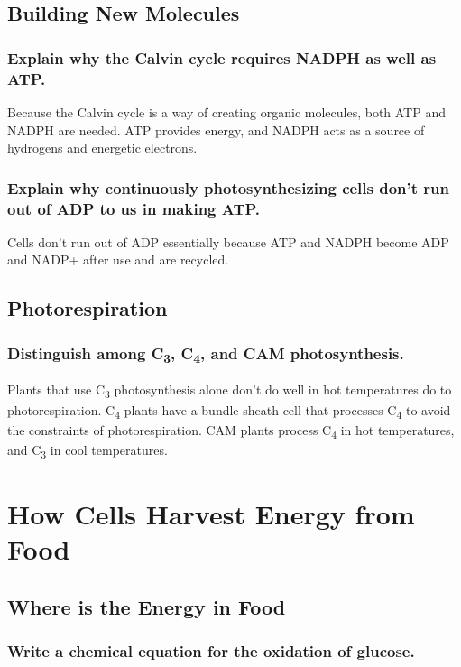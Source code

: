 \documentclass[a4paper]{article}
\begin{document}
\subsection{Building New Molecules}
\subsubsection{Explain why the Calvin cycle requires NADPH as well as ATP.}
Because the Calvin cycle is a way of creating organic molecules, both ATP and NADPH are needed.
ATP provides energy, and NADPH acts as a source of hydrogens and energetic electrons.

\subsubsection{Explain why continuously photosynthesizing cells don't run out of ADP
to us in making ATP.}
Cells don't run out of ADP essentially because ATP and NADPH become ADP and NADP+ 
after use and are recycled.
 

\subsection{Photorespiration}
\subsubsection{Distinguish among C\textsubscript{3}, C\textsubscript{4}, and CAM photosynthesis.}
Plants that use C\textsubscript{3} photosynthesis alone don't do well in hot temperatures
do to photorespiration. C\textsubscript{4} plants have a bundle sheath cell that processes
C\textsubscript{4} to avoid the constraints of photorespiration. CAM plants process C\textsubscript{4}
in hot temperatures, and C\textsubscript{3} in cool temperatures.





\section{How Cells Harvest Energy from Food}
\subsection{Where is the Energy in Food}
\subsubsection{Write a chemical equation for the oxidation of glucose.}
\end{document}

